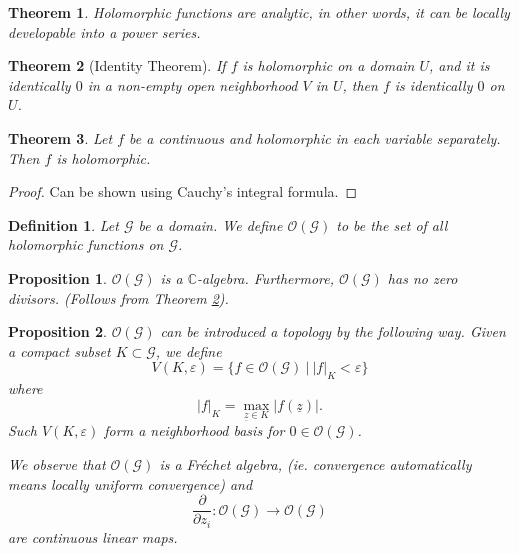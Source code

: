 \documentclass{article}
\newtheorem{theorem}{Theorem} [section]
\newtheorem{proposition}{Proposition}[section]
\newtheorem{definition}{Definition}[section]
\newcommand{\C}[0]{\mathbb{C}}
\newcommand{\G}[0]{\mathcal{G}}
\newcommand{\pd}[2]{{\frac {\partial#1} {\partial#2}}}
\begin{document}
\begin{theorem}
Holomorphic functions are analytic, in other words, it can be locally developable into a power series.
\end{theorem}

\begin{theorem}[Identity Theorem]
  \label{identity_theorem}
If $f$ is holomorphic on a domain $U$, and it is identically $0$ in a non-empty open neighborhood $V$ in $U$, then $f$ is identically $0$ on $U$.
\end{theorem}

\begin{theorem}
Let $f$ be a continuous and holomorphic in each variable separately. Then $f$ is holomorphic. 
\end{theorem}

\begin{proof}
Can be shown using Cauchy's integral formula.
\end{proof}

\begin{definition}
Let $\mathcal{G}$ be a domain. We define $\mathcal{O}(\mathcal{G})$ to be the set of all holomorphic functions on $\G$. 
\end{definition}

\begin{proposition}
$\mathcal{O}(\mathcal{G})$ is a $\C$-algebra. Furthermore, $\mathcal{O}(\mathcal{G})$ has no zero divisors. (Follows from Theorem \ref{identity_theorem}).
\end{proposition}

\begin{proposition}
$\mathcal{O}(\mathcal{G})$ can be introduced a topology by the following way. Given a compact subset $K\subset \mathcal{G}$, we define
\begin{equation*}
V(K,\varepsilon) = \{f\in\mathcal{O}(\mathcal{G})\:|\: \vert f\vert_K<\varepsilon\}
\end{equation*}
where
\begin{equation*}
\vert f\vert_K = \max_{\underline{z}\in K}\vert f(\underline{z})\vert.
\end{equation*}
Such $V(K,\varepsilon)$ form a neighborhood basis for $0\in\mathcal{O}(\mathcal{G})$.\\
\par We observe that $\mathcal{O}(\mathcal{G})$ is a Fréchet algebra, (ie. convergence automatically means locally uniform convergence) and 
\begin{equation*}
\pd{}{z_i}:\mathcal{O}(\mathcal{G}) \to\mathcal{O}(\mathcal{G})
\end{equation*}
are continuous linear maps.
\end{proposition}
\end{document}
